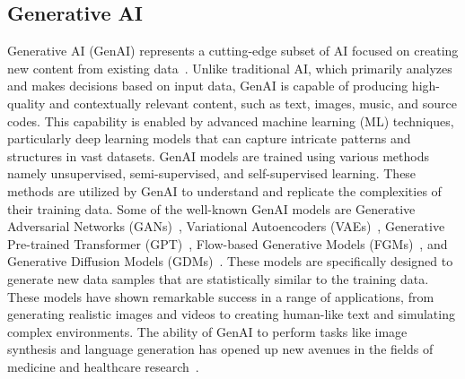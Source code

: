 \documentclass[5p,twocolumn]{elsarticle}
\begin{document}
\subsection{Generative AI}
Generative AI (GenAI) represents a cutting-edge subset of AI focused on creating new content from existing data~\cite{bengesi2024advancements}. Unlike traditional AI, which primarily analyzes and makes decisions based on input data, GenAI is capable of producing high-quality and contextually relevant content, such as text, images, music, and source codes. This capability is enabled by advanced machine learning (ML) techniques, particularly deep learning models that can capture intricate patterns and structures in vast datasets. GenAI models are trained using various methods namely unsupervised, semi-supervised, and self-supervised learning. These methods are utilized by GenAI to understand and replicate the complexities of their training data. Some of the well-known GenAI models are Generative Adversarial Networks (GANs)~\cite{goodfellow2014generative}, Variational Autoencoders (VAEs)~\cite{kingma2019introduction}, Generative Pre-trained Transformer (GPT)~\cite{yenduri2024gpt}, Flow-based Generative Models (FGMs)~\cite{ho2019flow}, and Generative Diffusion Models (GDMs)~\cite{cao2024survey}. These models are specifically designed to generate new data samples that are statistically similar to the training data. These models have shown remarkable success in a range of applications, from generating realistic images and videos to creating human-like text and simulating complex environments. The ability of GenAI to perform tasks like image synthesis and language generation has opened up new avenues in the fields of medicine and healthcare research~\cite{thirunavukarasu2023large}. 
\end{document}
